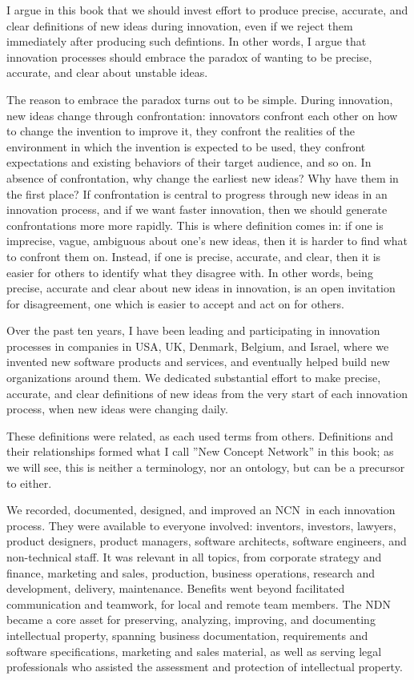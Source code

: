 \documentclass[graybox,envcountchap,sectrefs]{svmono}
\newcommand{\ncn}{NCN}
\newcommand{\ncnf}{New Concept Network}
\begin{document}
I argue in this book that we should invest effort to produce precise, accurate, and clear definitions of new ideas during innovation, even if we reject them immediately after producing such defintions. In other words, I argue that innovation processes should embrace the paradox of wanting to be precise, accurate, and clear about unstable ideas. 

The reason to embrace the paradox turns out to be simple. During innovation, new ideas change through confrontation: innovators confront each other on how to change the invention to improve it, they confront the realities of the environment in which the invention is expected to be used, they confront expectations and existing behaviors of their target audience, and so on. In absence of confrontation, why change the earliest new ideas? Why have them in the first place? If confrontation is central to progress through new ideas in an innovation process, and if we want faster innovation, then we should generate confrontations more more rapidly. This is where definition comes in: if one is imprecise, vague, ambiguous about one's new ideas, then it is harder to find what to confront them on. Instead, if one is precise, accurate, and clear, then it is easier for others to identify what they disagree with. In other words, being precise, accurate and clear about new ideas in innovation, is an open invitation for disagreement, one which is easier to accept and act on for others. 

Over the past ten years, I have been leading and participating in innovation processes in companies in USA, UK, Denmark, Belgium, and Israel, where we invented new software products and services, and eventually helped build new organizations around them. We dedicated substantial effort to make precise, accurate, and clear definitions of new ideas from the very start of each innovation process, when new ideas were changing daily. 

These definitions were related, as each used terms from others. Definitions and their relationships formed what I call ''\ncnf'' in this book; as we will see, this is neither a terminology, nor an ontology, but can be a precursor to either. 

We recorded, documented, designed, and improved an \ncn\ in each innovation process. They were available to everyone involved: inventors, investors, lawyers, product designers, product managers, software architects, software engineers, and non-technical staff. It was relevant in all topics, from corporate strategy and finance, marketing and sales, production, business operations, research and development, delivery, maintenance. Benefits went beyond facilitated communication and teamwork, for local and remote team members. The NDN became a core asset for preserving, analyzing, improving, and documenting intellectual property, spanning business documentation, requirements and software specifications, marketing and sales material, as well as serving legal professionals who assisted the assessment and protection of intellectual property.
\end{document}
